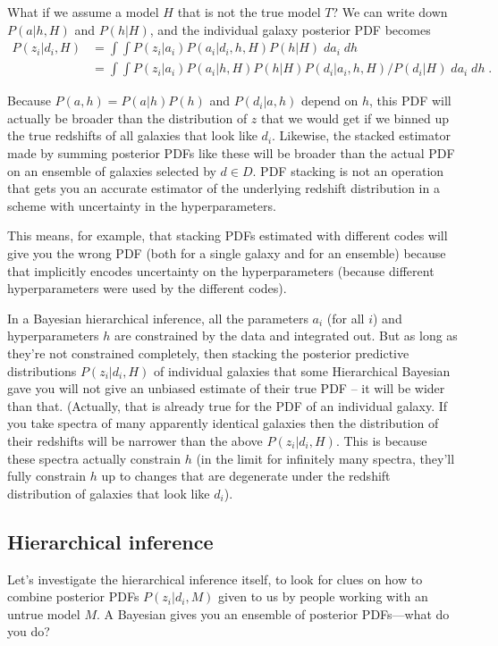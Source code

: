 \documentclass[11pt]{amsart}
\begin{document}
What if we assume a model $H$ that is not the true model $T$? We can write down $P(a|h,H)$ and $P(h|H)$, and the individual galaxy posterior PDF becomes
\begin{align}
P(z_i | d_i, H) &= \int\int P(z_i|a_i) P(a_i|d_i,h,H) P(h|H) \; da_i\; dh \\
                &= \int\int P(z_i|a_i) P(a_i|h,H) P(h|H) P(d_i|a_i,h,H) / P(d_i|H) \; da_i \; dh \; .
\end{align}

Because $P(a,h)=P(a|h)P(h)$ and $P(d_i|a,h)$ depend on $h$, this PDF
will actually be broader than the distribution of $z$ that we would get
if we binned up the true redshifts of all galaxies that look like $d_i$.
Likewise, the stacked estimator made by summing posterior PDFs like
these will be broader than the actual PDF on an ensemble of galaxies
selected by $d\in D$. PDF stacking is not an operation that gets you an
accurate estimator of the underlying redshift distribution in a scheme
with uncertainty in the hyperparameters.

This means, for example, that stacking PDFs estimated with different
codes will give you the wrong PDF (both for a single galaxy and for an
ensemble) because that implicitly encodes uncertainty on the
hyperparameters (because different hyperparameters were used by the
different codes).

In a Bayesian hierarchical inference, all the parameters $a_i$ (for all
$i$) and hyperparameters $h$ are constrained by the data and integrated
out. But as long as they're not constrained completely, then stacking
the posterior predictive distributions $P(z_i|d_i,H)$ of individual
galaxies that some Hierarchical Bayesian gave you will not give an unbiased estimate of their true PDF -- it will
be wider than that. (Actually, that is already true for the PDF of an
individual galaxy. If you take spectra of many apparently identical
galaxies then the distribution of their redshifts will be narrower than
the above $P(z_i|d_i,H)$. This is because these spectra actually
constrain $h$ (in the limit for infinitely many spectra, they'll fully
constrain $h$ up to changes that are degenerate under the redshift
distribution of galaxies that look like $d_i$).


\subsection{Hierarchical inference}

Let's investigate the hierarchical inference itself, to look for clues
on how to combine posterior PDFs $P(z_i|d_i,M)$ given to us by people
working with an untrue model $M$. A Bayesian gives you an ensemble of
posterior PDFs---what do you do?
\end{document}
